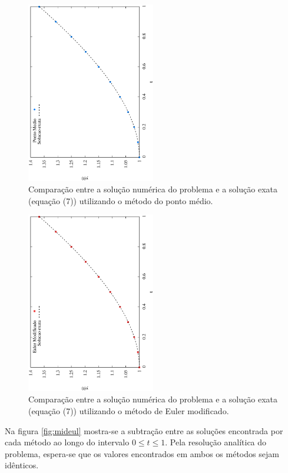 \documentclass[brazilian, 12pt, a4paper, final]{article}
\begin{document}
\begin{figure}[htbp]
  \centering
  \includegraphics[width=0.50\textwidth,angle=-90]{solucao_mid.eps}
  \caption{Comparação entre a solução numérica do problema e a solução exata (equação (7)) utilizando o método do ponto médio.}
  \label{fig:solmid}
\end{figure}

\begin{figure}[htbp]
  \centering
  \includegraphics[width=0.50\textwidth,angle=-90]{solucao_eul.eps}
  \caption{Comparação entre a solução numérica do problema e a solução exata (equação (7)) utilizando o método de Euler modificado.}
  \label{fig:soleul}
\end{figure}


Na figura \ref{fig:mideul} mostra-se a subtração entre as soluções encontrada por cada método ao longo do intervalo $0\le t \le 1$. Pela resolução analítica do problema, espera-se que os valores encontrados em ambos os métodos sejam idênticos.
\end{document}
